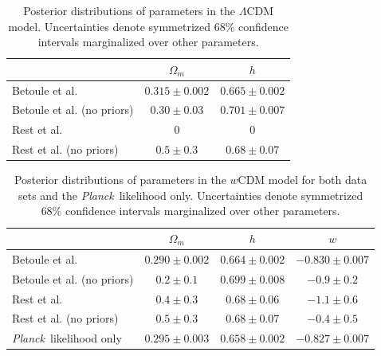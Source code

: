 \documentclass[12pt,a4paper]{article}
\newcommand\Planck{{\it Planck}\ }
\begin{document}
\begin{table}[h]
   \centering
    \begin{tabular}{l|cc}
    ~                          & $\Omega_m$ & $h$ \\ \hline
    Betoule et al.             & $0.315 \pm 0.002$      & $0.665 \pm 0.002$ \\
    Betoule et al. (no priors) & $0.30 \pm 0.03$      & $0.701 \pm 0.007$ \\
    Rest et al.                & 0      & 0 \\
    Rest et al. (no priors)    & $0.5 \pm 0.3$      & $0.68 \pm 0.07$ \\
    \end{tabular}
    \caption {\label{tab:lcdm}Posterior distributions of parameters in the
      $\Lambda$CDM model. Uncertainties denote symmetrized 68\%
      confidence intervals marginalized over other parameters.}
\end{table}
%
\begin{table}[h]
  \label{tab:wcdm}
  \centering
  \begin{tabular}{l|ccc}
    ~                          & $\Omega_m$ & $h$ & $w$ \\ \hline
    Betoule et al.             & $0.290 \pm 0.002$                      & $0.664 \pm 0.002$     & $-0.830 \pm 0.007$     \\
    Betoule et al. (no priors) & $0.2 \pm 0.1$                      & $0.699 \pm 0.008$     & $-0.9 \pm 0.2$     \\
    Rest et al.                & $0.4 \pm 0.3$                      & $0.68 \pm 0.06$     & $-1.1 \pm 0.6$     \\
    Rest et al. (no priors)    & $0.5 \pm 0.3$                      & $0.68 \pm 0.07$    & $-0.4 \pm 0.5$     \\
    \Planck likelihood only    & $0.295 \pm 0.003$                      & $0.658 \pm 0.002$     & $-0.827 \pm 0.007$     \\
  \end{tabular}
  \caption {Posterior distributions of parameters in the
    $w$CDM model for both data sets and the \Planck likelihood only. 
    Uncertainties denote symmetrized 68\%
    confidence intervals marginalized over other parameters.}
\end{table}
%
\end{document}
